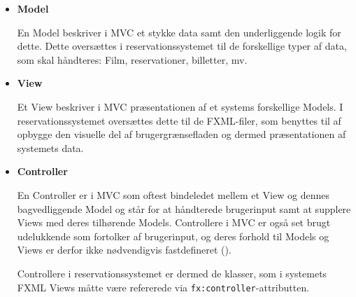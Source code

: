 \begin{itemize}
  \item
    \textbf{Model}
  
    En Model beskriver i MVC et stykke data samt den underliggende logik for dette. Dette oversættes i reservationssystemet til de forskellige typer af data, som skal håndteres: Film, reservationer, billetter, mv.
  \item
    \textbf{View}
    
    Et View beskriver i MVC præsentationen af et systems forskellige Models. I reservationssystemet oversættes dette til de FXML-filer, som benyttes til af opbygge den visuelle del af brugergrænsefladen og dermed præsentationen af systemets data.
  \item
    \textbf{Controller}
    
    En Controller er i MVC som oftest bindeledet mellem et View og dennes bagvedliggende Model og står for at håndterede brugerinput samt at supplere Views med deres tilhørende Models. Controllere i MVC er også set brugt udelukkende som fortolker af brugerinput, og deres forhold til Models og Views er derfor ikke nødvendigvis fastdefineret (\cite{burbeck1987}).
    
    Controllere i reservationssystemet er dermed de klasser, som i systemets FXML Views måtte være refererede via \texttt{fx:controller}-attributten.
\end{itemize}
